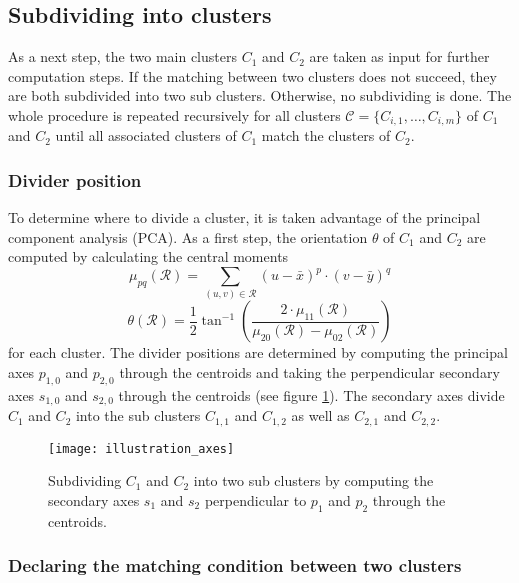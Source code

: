 \subsection{Subdividing into clusters}

As a next step, the two main clusters $C_1$ and $C_2$ are taken as input for further computation steps. If the matching between two clusters does not succeed, they are both subdivided into two sub clusters. Otherwise, no subdividing is done. The whole procedure is repeated recursively for all clusters $\mathcal{C} = \{C_{i,1}, \ldots, C_{i,m}\}$ of $C_1$ and $C_2$ until all associated clusters of $C_1$ match the clusters of $C_2$.  

\subsubsection{Divider position}

To determine where to divide a cluster, it is taken advantage of the principal component analysis (PCA). As a first step, the orientation $\theta$ of $C_1$ and $C_2$ are computed by calculating the central moments
\begin{equation}
	\mu_{pq}(\mathcal{R}) = \sum_{(u,v)\in\mathcal{R}} (u - \bar{x})^p \cdot (v - \bar{y})^q
\end{equation}
\begin{equation}
	\theta(\mathcal{R}) = \frac{1}{2} \tan^{-1} \left(\frac{2\cdot \mu_{11}(\mathcal{R})}{\mu_{20}(\mathcal{R}) - \mu_{02}(\mathcal{R})}\right)
\end{equation}
for each cluster.	
The divider positions are determined by computing the principal axes $p_{1,0}$ and $p_{2,0}$ through the centroids and taking the perpendicular secondary axes $s_{1,0}$ and $s_{2,0}$ through the centroids (see figure \ref{fig:dc_axes_2p}). The secondary axes divide $C_1$ and $C_2$ into the sub clusters $C_{1,1}$ and $C_{1,2}$ as well as $C_{2,1}$ and $C_{2,2}$.

\begin{figure}
	\centering
	\texttt{[image: illustration\_axes]}
	\caption{Subdividing $C_1$ and $C_2$ into two sub clusters by computing the secondary axes $s_1$ and $s_2$ perpendicular to $p_1$ and $p_2$ through the centroids.}
	\label{fig:dc_axes_2p}
\end{figure}

\subsubsection{Declaring the matching condition between two clusters}

